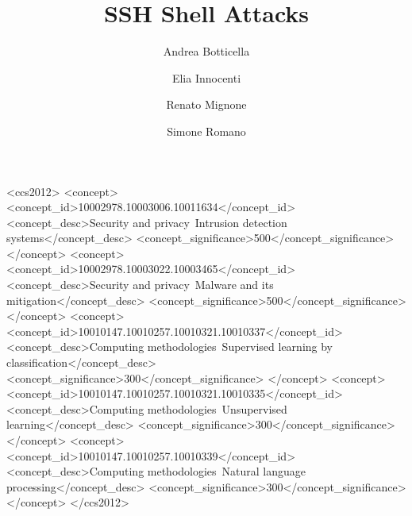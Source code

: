 \documentclass[acmlarge]{template/column-format-template/acmart}
\begin{document}
\title{SSH Shell Attacks}


\author{Andrea Botticella}

\author{Elia Innocenti}
\authornotemark[1]

\author{Renato Mignone}
\authornotemark[1]

\author{Simone Romano}
\authornotemark[1]

\renewcommand{\shortauthors}{Botticella, Innocenti, Mignone, and Romano}

\begin{CCSXML}
<ccs2012>
   <concept>
       <concept_id>10002978.10003006.10011634</concept_id>
       <concept_desc>Security and privacy~Intrusion detection systems</concept_desc>
       <concept_significance>500</concept_significance>
   </concept>
   <concept>
       <concept_id>10002978.10003022.10003465</concept_id>
       <concept_desc>Security and privacy~Malware and its mitigation</concept_desc>
       <concept_significance>500</concept_significance>
   </concept>
   <concept>
       <concept_id>10010147.10010257.10010321.10010337</concept_id>
       <concept_desc>Computing methodologies~Supervised learning by classification</concept_desc>
       <concept_significance>300</concept_significance>
   </concept>
   <concept>
       <concept_id>10010147.10010257.10010321.10010335</concept_id>
       <concept_desc>Computing methodologies~Unsupervised learning</concept_desc>
       <concept_significance>300</concept_significance>
   </concept>
   <concept>
       <concept_id>10010147.10010257.10010339</concept_id>
       <concept_desc>Computing methodologies~Natural language processing</concept_desc>
       <concept_significance>300</concept_significance>
   </concept>
</ccs2012>
\end{CCSXML}

\end{document}
